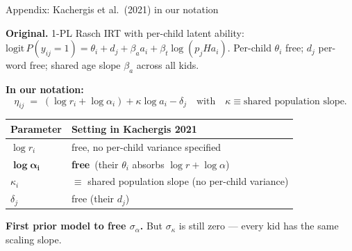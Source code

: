 \documentclass[
  ignorenonframetext,
  aspectratio=169,
  t]{beamer}
\renewcommand{\arraystretch}{1.10}
\begin{document}
\begin{frame}{Appendix: Kachergis et al.~(2021) in our notation}
\label{appendix-kachergis-et-al.-2021-in-our-notation}
\small

\textbf{Original.} 1-PL Rasch IRT with per-child latent ability:
\(\mathrm{logit}\,P(y_{ij}=1) = \theta_i + d_j + \beta_a a_i + \beta_t \log(p_j H a_i)\).
Per-child \(\theta_i\) free; \(d_j\) per-word free; shared age slope
\(\beta_a\) across all kids.

\vspace{0.6em}
\centering

\textbf{In our notation:} \[
\eta_{ij} \;=\; (\log r_i + \log\alpha_i) + \kappa \log a_i - \delta_j
\quad\text{with}\quad \kappa \equiv \text{shared population slope}.
\]

\vspace{0.4em}
\renewcommand{\arraystretch}{1.20}
\begin{tabular}{@{}ll@{}}
\toprule
\textbf{Parameter} & \textbf{Setting in Kachergis 2021} \\
\midrule
$\log r_i$         & free, no per-child variance specified \\
$\boldsymbol{\log\alpha_i}$ & \textbf{free} \,(their $\theta_i$ absorbs $\log r + \log\alpha$) \\
$\kappa_i$         & $\equiv$ shared population slope (no per-child variance) \\
$\delta_j$         & free (their $d_j$) \\
\bottomrule
\end{tabular}

\vspace{0.6em}

\textbf{First prior model to free \(\sigma_\alpha\).} But
\(\sigma_\kappa\) is still zero --- every kid has the same scaling
slope.
\end{frame}
\end{document}
